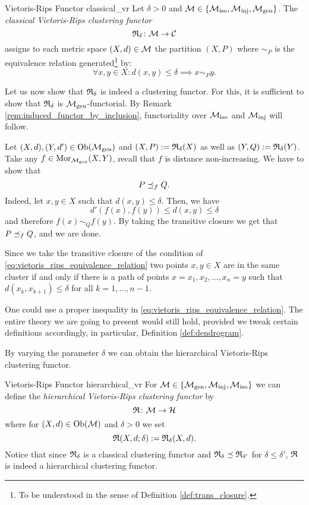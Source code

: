 \begin{example}{Vietoris-Rips Functor \cite[Def.~6.1]{Carlsson2010}}{classical_vr}
    Let $\delta > 0$ and $\mathcal{M} \in \{{\mathcal{M}_\mathrm{iso}}, {\mathcal{M}_\mathrm{inj}}, {\mathcal{M}_\mathrm{gen}}\}$. The \emph{classical Vietoris-Rips clustering functor}
    $$
    \mathfrak{R}_\delta\colon \mathcal{M} \to \mathcal{C}
    $$
    assigns to each metric space $(X,d) \in \mathcal{M}$ the partition $(X,P)$ where $\sim_P$ is the equivalence relation generated\footnote{To be understood in the sense of Definition \ref{def:trans_closure}.} by:
    \begin{equation}
        \label{eq:vietoris_rips_equivalence_relation}
        \forall x,y \in X: d(x,y) \leq \delta \implies x \sim_P y.
    \end{equation}

    Let us now show that $\mathfrak{R}_\delta$ is indeed a clustering functor.
    For this, it is sufficient to show that $\mathfrak{R}_\delta$ is ${\mathcal{M}_\mathrm{gen}}$-functorial. By Remark \ref{rem:induced_functor_by_inclusion}, functoriality over ${\mathcal{M}_\mathrm{iso}}$ and ${\mathcal{M}_\mathrm{inj}}$ will follow.
    \medskip

    Let $(X,d),(Y,d') \in \mathrm {Ob}({\mathcal{M}_\mathrm{gen}})$ and $(X,P) := \mathfrak{R}_\delta(X)$ as well as $(Y,Q) := \mathfrak{R}_\delta(Y)$.
    Take any $f \in \mathrm {Mor}_{\mathcal{M}_\mathrm{gen}}(X,Y)$, recall that $f$ is distance non-increasing.
    We have to show that 
    $$P \preceq_f Q.$$
    Indeed, let $x,y \in X$ such that $d(x,y) \leq \delta$.
    Then, we have
    $$
    d'(f(x), f(y)) \leq d(x,y) \leq \delta
    $$
    and therefore $f(x) \sim_{Q} f(y)$.
    By taking the transitive closure we get that $P \preceq_f Q$, and we are done.
\end{example}

Since we take the transitive closure of the condition of \eqref{eq:vietoris_rips_equivalence_relation} two points $x,y \in X$ are in the same cluster if and only if there is a path of points $x = x_1, x_2, \dots, x_n = y$ such that $d(x_k, x_{k+1}) \leq \delta$ for all $k = 1, \dots, n-1$.

\begin{myremark}{}{}
One could use a proper inequality in \eqref{eq:vietoris_rips_equivalence_relation}. The entire theory we are going to present would still hold, provided we tweak certain definitions accordingly, in particular, Definition \ref{def:dendrogram}.
\end{myremark}

By varying the parameter $\delta$ we can obtain the hierarchical Vietoris-Rips clustering functor.

\begin{example}{Vietoris-Rips Functor \cite[Ex.~7.1]{Carlsson2010}}{hierarchical_vr}
For $\mathcal{M} \in \{{\mathcal{M}_\mathrm{gen}},{\mathcal{M}_\mathrm{inj}},{\mathcal{M}_\mathrm{iso}}\}$ we can define the \emph{hierarchical Vietoris-Rips clustering functor} by
$$
\mathfrak{R}\colon \mathcal{M} \to \mathcal{H}
$$
where for $(X,d) \in \mathrm {Ob}(\mathcal{M})$ and $\delta > 0$ we set
$$
\mathfrak{R}(X,d; \delta) := \mathfrak{R}_\delta(X,d).
$$
Notice that since $\mathfrak{R}_\delta$ is a classical clustering functor and $\mathfrak{R}_\delta \preceq \mathfrak{R}_{\delta'}$ for $\delta \leq \delta'$, $\mathfrak{R}$ is indeed a hierarchical clustering functor.
\end{example}

